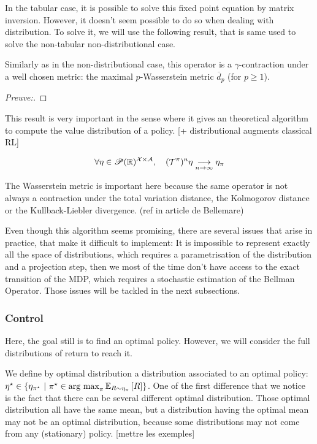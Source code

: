 In the tabular case, it is possible to solve this fixed point equation by matrix inversion. However, it doesn’t seem possible to do so when dealing with distribution. To solve it, we will use the following result, that is same used to solve the non-tabular non-distributional case.

Similarly as in the non-distributional case, this operator is a $\gamma$-contraction under a well chosen metric: the maximal $p$-Wasserstein metric $\overline{d}_p$ (for $p \geq 1$).
\begin{proof}[Preuve:]
\end{proof}

This result is very important in the sense where it gives an theoretical algorithm to compute the value distribution of a policy. [+ distributional augments classical RL]

\[ \forall \eta \in \mathscr{P}(\mathbb{R})^{\mathcal{X} \times \mathcal{A}}, \quad (\mathcal{T}^\pi )^n \eta \underset{n \rightarrow \infty}{\longrightarrow} \eta_\pi \]

The Wasserstein metric is important here because the same operator is not always a contraction under the total variation distance, the Kolmogorov distance or the Kullback-Liebler divergence. (ref in article de Bellemare)

Even though this algorithm seems promising, there are several issues that arise in practice, that make it difficult to implement: It is impossible to represent exactly all the space of distributions, which requires a parametrisation of the distribution and a projection step, then we most of the time don’t have access to the exact transition of the MDP, which requires a stochastic estimation of the Bellman Operator. Those issues will be tackled in the next subsections.

\subsubsection*{Control} 
Here, the goal still is to find an optimal policy. However, we will consider the full distributions of return to reach it.

We define by optimal distribution a distribution associated to an optimal policy: $\eta^{\star} \in \{ \eta_{\pi^{\star}} \ | \ \pi^{\star} \in \operatorname*{\mbox{arg max}}_{\pi} \mathbb{E}_{R \sim \eta_\pi}\left[ R \right]\}$.
One of the first difference that we notice is the fact that there can be several different optimal distribution. Those optimal distribution all have the same mean, but a distribution having the optimal mean may not be an optimal distribution, because some distributions may not come from any (stationary) policy. [mettre les exemples]
 

